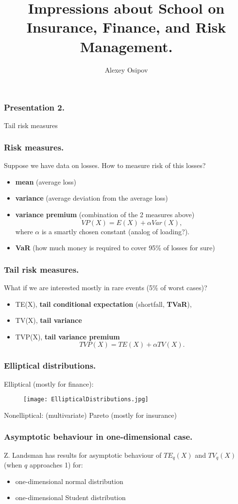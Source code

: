 \documentclass{beamer}
\title{Impressions about School on Insurance, Finance, and Risk Management.}
\author{Alexey Osipov}
\begin{document}
\maketitle
\begin{frame}[fragile]
\frametitle{Presentation 2.}
\begin{center}
\Large{Tail risk measures}
\end{center}
\end{frame}
\begin{frame}[fragile]
\frametitle{Risk measures.}
Suppose we have data on losses. How to measure risk of this losses?

\begin{itemize}
	\item \textbf{mean} (average loss)
	\item \textbf{variance} (average deviation from the average loss)
	\item \textbf{variance premium} (combination of the 2 measures above)
	$$VP(X) = E(X) + \alpha Var(X),$$
	where $\alpha$ is a smartly chosen constant (analog of loading?).
	\item \textbf{VaR} (how much money is required to cover 95\% of losses for sure)
\end{itemize}
\end{frame}
\begin{frame}[fragile]
\frametitle{Tail risk measures.}
What if we are interested mostly in rare events (5\% of worst cases)?

\begin{itemize}
	\item TE(X), \textbf{tail conditional expectation} (shortfall, \textbf{TVaR}),
	\item TV(X), \textbf{tail variance}
	\item TVP(X), \textbf{tail variance premium}
		$$TVP(X) = TE(X) + \alpha TV(X).$$
\end{itemize}
\end{frame}
\begin{frame}[fragile]
\frametitle{Elliptical distributions.}
Elliptical (mostly for finance):
\begin{figure}[h!]
\centering
\texttt{[image: EllipticalDistributions.jpg]}
\end{figure}
Nonelliptical: (multivariate) Pareto (mostly for insurance)
\end{frame}
\begin{frame}[fragile]
\frametitle{Asymptotic behaviour in one-dimensional case.}
Z. Landsman has results for asymptotic behaviour of $TE_q(X)$ and $TV_q(X)$ (when $q$ approaches 1) for:
\begin{itemize}
	\item one-dimensional normal distribution
	\item one-dimensional Student distribution
\end{itemize}
\end{frame}
\end{document}
